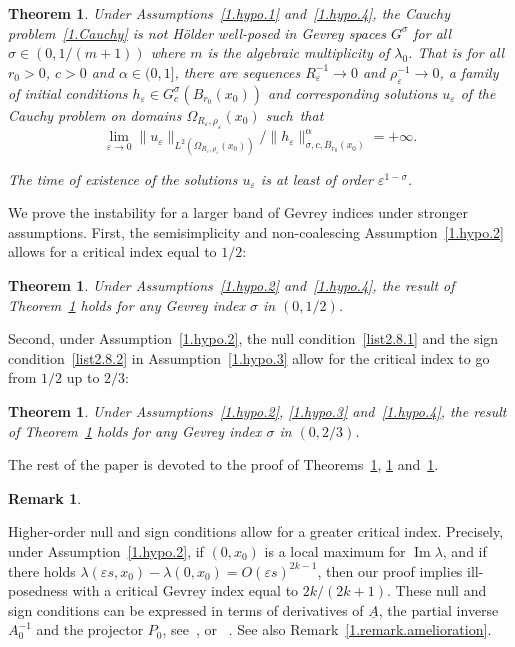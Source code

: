 \documentclass[10pt]{amsart}
\newtheorem{theo}[cdrthm]{Theorem}
\theoremstyle{definition}
\newtheorem{rema}[cdrthm]{Remark}
\theoremstyle{plain}
\newcommand*\e{\varepsilon}
\newcommand{\alf}{\alpha}%
\newcommand*\und{\underline}
\DeclareMathOperator{\Imm}{Im}
\begin{document}
\begin{theo}\label{1.theorem.2}
Under Assumptions~\ref{1.hypo.1} and~\ref{1.hypo.4}, the Cauchy problem~\eqref{1.Cauchy} is not H\"older well-posed in Gevrey spaces $G^{\sigma}$ for all $\sigma \in(0,1/(m+1))$ where $m$ is the algebraic multiplicity of $\lambda_0$. That is for all $r_0>0$, $c>0$ and $\alf\in(0,1]$, there are sequences $R_{\e}^{-1} \to 0$ and $\rho_{\e}^{-1} \to 0$, a family of initial conditions $h_{\e}\in G_{c}^{\sigma}\left(B_{r_0}(x_0)\right)$ and corresponding solutions $u_{\e}$ of the Cauchy problem on domains $\Omega_{R_{\e},\rho_{\e}}(x_0)$ such~that
\begin{equation}
\lim_{\e\to 0} \|u_{\e}\|_{L^2(\Omega_{R_{\e},\rho_{\e}}(x_0))} / \|h_{\e}\|_{\sigma,c,B_{r_0}(x_0)}^{\alf} = +\infty.
\end{equation}


The time of existence of the solutions $u_{\e}$ is at least of order $\e^{1-\sigma} $.
\end{theo}


We prove the instability for a larger band of Gevrey indices under stronger assumptions. First, the semisimplicity and non-coalescing Assumption~\ref{1.hypo.2} allows for a critical index equal to $1/2$:


\begin{theo}\label{1.theorem.3}
Under Assumptions~\ref{1.hypo.2} and~\ref{1.hypo.4}, the result of Theorem~\ref{1.theorem.2} holds for any Gevrey index $\sigma$ in $(0,1/2)$.
\end{theo}


Second, under Assumption~\ref{1.hypo.2}, the null condition~\eqref{list2.8.1} and the sign condition~\eqref{list2.8.2} in Assumption~\ref{1.hypo.3} allow for the critical index to go from $1/2$ up to $2/3$:


\begin{theo}\label{1.theorem.4}
Under Assumptions~\ref{1.hypo.2}, \ref{1.hypo.3} and~\ref{1.hypo.4}, the result of Theorem~\ref{1.theorem.2} holds for any Gevrey index $\sigma$ in $(0,2/3)$.
\end{theo}


The rest of the paper is devoted to the proof of Theorems~\ref{1.theorem.2}, \ref{1.theorem.3} and~\ref{1.theorem.4}.

\begin{rema}\label{1.remark.aprestheo3}

Higher-order null and sign conditions allow for a greater critical index. Precisely, under Assumption~\ref{1.hypo.2}, if $(0,x_0)$ is a local maximum for $ {\Imm}\lambda $, and if there holds $ \lambda(\e s,x_0) - \lambda(0,x_0) = O(\e s)^{2k-1} $, then our proof implies ill-posedness with a critical Gevrey index equal to $2k/(2k+1)$. These null and sign conditions can be expressed in terms of derivatives of $\und{A}$, the partial inverse $A_0^{-1}$ and the projector $P_0$, see~\cite{kato2013perturbation}, or ~\cite[Remark~2.7]{texier2004short}. See also Remark~\ref{1.remark.amelioration}.
\end{rema}
\end{document}
